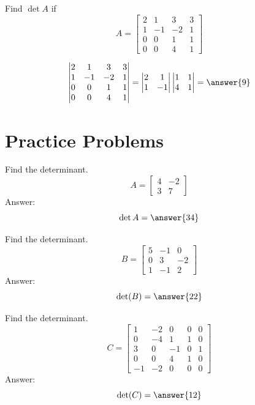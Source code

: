\documentclass{ximera}
\begin{document}
\begin{example}\label{ex:blockTriDet}
    Find $\det{A}$ if 
    $$A=\begin{bmatrix}2&1&3&3\\1&-1&-2&1\\0&0&1&1\\0&0&4&1\end{bmatrix}$$
  \begin{explanation}
      $$\begin{vmatrix}2&1&3&3\\1&-1&-2&1\\0&0&1&1\\0&0&4&1\end{vmatrix}=\begin{vmatrix}2&1\\1&-1\end{vmatrix}\begin{vmatrix}1&1\\4&1\end{vmatrix}=\answer{9}$$
  \end{explanation}  
\end{example}


\section*{Practice Problems}

  \begin{problem}\label{prob:2x2det1} Find the determinant.
  $$A=\begin{bmatrix}4&-2\\3&7\end{bmatrix}$$
  Answer:
  $$\det{A}=\answer{34}$$
  \end{problem}
  
  \begin{problem}\label{prob:2x2det2} Find the determinant.
  $$B=\begin{bmatrix}5&-1&0\\0&3&-2\\1&-1&2\end{bmatrix}$$
  Answer:
  $$\text{det}(B)=\answer{22}$$
  \end{problem}

  \begin{problem}\label{prob:laplace} Find the determinant.
  $$C=\begin{bmatrix}1&-2&0&0&0\\0&-4&1&1&0\\3&0&-1&0&1\\0&0&4&1&0\\-1&-2&0&0&0\end{bmatrix}$$
   Answer:
  $$\det(C)=\answer{12}$$
 \end{problem}
\end{document}
